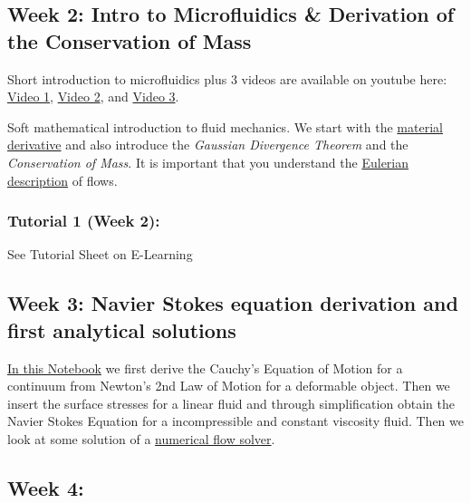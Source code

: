 \documentclass[11pt]{article}
\begin{document}
\subsection{Week 2: Intro to Microfluidics \& Derivation of the
Conservation of
Mass}\label{week-2-intro-to-microfluidics-derivation-of-the-conservation-of-mass}

Short introduction to microfluidics plus 3 videos are available on
youtube here: \href{https://www.youtube.com/watch?v=b8zE2i755-k}{Video
1}, \href{https://www.youtube.com/watch?v=68p3qAm4i7U}{Video 2}, and
\href{https://www.youtube.com/watch?v=EYuyRUjnTgc}{Video 3}.

Soft mathematical introduction to fluid mechanics. We start with the
\href{Material\%20Derivative,\%20Gaussian\%20Divergence\%20Theorem\%20and\%20Conservation\%20of\%20Mass.ipynb}{material
derivative} and also introduce the \emph{Gaussian Divergence Theorem}
and the \emph{Conservation of Mass}. It is important that you understand
the
\href{https://en.wikipedia.org/wiki/Lagrangian_and_Eulerian_specification_of_the_flow_field}{Eulerian
description} of flows.

\subsubsection{Tutorial 1 (Week 2):}\label{tutorial-1-week-2}

See Tutorial Sheet on E-Learning

\subsection{Week 3: Navier Stokes equation derivation and first
analytical
solutions}\label{week-3-navier-stokes-equation-derivation-and-first-analytical-solutions}

\href{Cauchy's\%20Equation\%20of\%20Motion\%20\&\%20Navier\%20Stokes\%20Equation.ipynb}{In
this Notebook} we first derive the Cauchy's Equation of Motion for a
continuum from Newton's 2nd Law of Motion for a deformable object. Then
we insert the surface stresses for a linear fluid and through
simplification obtain the Navier Stokes Equation for a incompressible
and constant viscosity fluid. Then we look at some solution of a
\href{13a_Navier\%20Stokes\%20example.ipynb}{numerical flow solver}.

\subsection{Week 4:}\label{week-4}
\end{document}
